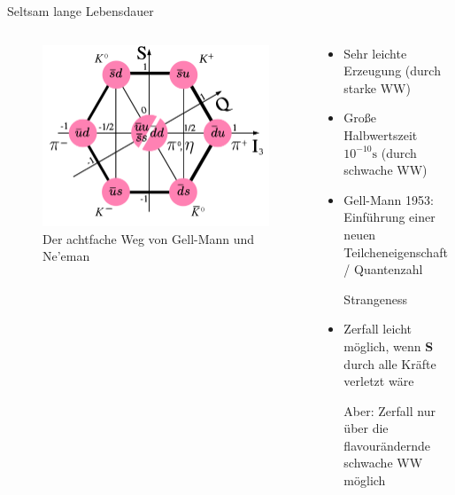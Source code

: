 \documentclass[aspectratio=1610, professionalfonts, 9pt, t]{beamer}
\begin{document}
  \begin{frame}{Seltsam lange Lebensdauer}
    \begin{columns}[onlytextwidth]
      \begin{column}{0.4\textwidth}
        \begin{figure}[ht]
          \begin{center}
            \includegraphics[height=0.6\textheight]{Images/Meson-octet.png} %
            \caption{Der achtfache Weg von Gell-Mann und Ne'eman}
          \end{center}
        \end{figure}
      \end{column}
      \begin{column}{0.5\textwidth}
        \begin{itemize}
          \item Sehr leichte Erzeugung (durch starke WW)
          \item Große Halbwertszeit $10^{-10}\si{\second}$ (durch schwache WW)
          \item Gell-Mann 1953: Einführung einer neuen Teilcheneigenschaft/ Quantenzahl \item[\rightarrow] Strangeness
          \item Zerfall leicht möglich, wenn \textbf{S} durch alle Kräfte verletzt wäre
          \item[Aber:] Zerfall nur über die flavourändernde schwache WW möglich
        \end{itemize}
      \end{column}
    \end{columns}
  \end{frame}
\end{document}
